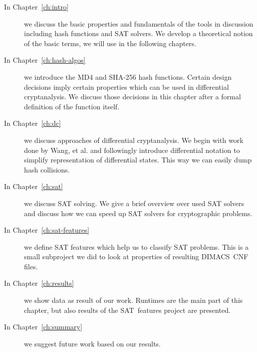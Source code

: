 \begin{description}
\item[In Chapter~\ref{ch:intro}] we discuss the basic properties and fundamentals
of the tools in discussion including hash functions and SAT solvers. We develop
a theoretical notion of the basic terms, we will use in the following chapters.

\item[In Chapter~\ref{ch:hash-algos}] we introduce the MD4 and SHA-256 hash functions.
Certain design decisions imply certain properties which can be used in differential
cryptanalysis. We discuss those decisions in this chapter after a formal definition
of the function itself.

\item[In Chapter~\ref{ch:dc}] we discuss approaches of differential cryptanalysis.
We begin with work done by Wang, et al. and followingly introduce differential notation
to simplify representation of differential states. This way we can easily dump
hash collisions.

\item[In Chapter~\ref{ch:sat}] we discuss SAT solving. We give a brief overview
over used SAT solvers and discuss how we can speed up SAT solvers for cryptographic
problems.

\item[In Chapter~\ref{ch:sat-features}] we define SAT features which help us to
classify SAT problems. This is a small subproject we did to look at properties
of resulting DIMACS~CNF files.

\item[In Chapter~\ref{ch:results}] we show data as result of our work.
Runtimes are the main part of this chapter, but also results of the SAT~features
project are presented.

\item[In Chapter~\ref{ch:summary}] we suggest future work based on our results.
\end{description}

